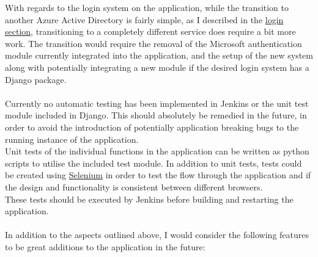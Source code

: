 With regards to the login system on the application, while the transition to another Azure Active Directory is fairly simple, as I described in the \hyperref[sec:login]{login section}, transitioning to a completely different service does require a bit more work. The transition would require the removal of the Microsoft authentication module currently integrated into the application, and the setup of the new system along with potentially integrating a new module if the desired login system has a Django package.\\\\
Currently no automatic testing has been implemented in Jenkins or the unit test module included in Django. This should absolutely be remedied in  the future, in order to avoid the introduction of potentially application breaking bugs to the running instance of the application.\\
Unit tests of the individual functions in the application can be written as python scripts to utilise the included test module. In addition to unit tests, tests could be created using \href{https://www.selenium.dev/}{Selenium} in order to test the flow through the application and if the design and functionality is consistent between different browsers.\\
These tests should be executed by Jenkins before building and restarting the application.\\\\
In addition to the aspects outlined above, I would consider the following features to be great additions to the application in the future:\\
